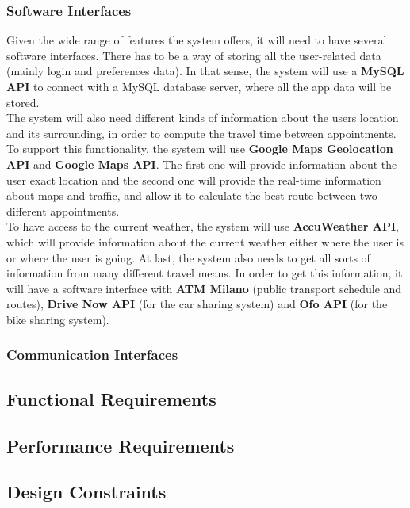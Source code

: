 \documentclass[12pt]{article}
\begin{document}
\subsubsection{Software Interfaces}
Given the wide range of features the system offers, it will need to have several software interfaces. There has to be a way of storing all the user-related data (mainly login and preferences data). In that sense, the system will use a \textbf{MySQL API} to connect with a MySQL database server, where all the app data will be stored.\\
The system will also need different kinds of information about the users location and its surrounding, in order to compute the travel time between appointments. To support this functionality, the system will use \textbf{Google Maps Geolocation API} and \textbf{Google Maps API}. The first one will provide information about the user exact location and the second one will provide the real-time information about maps and traffic, and allow it to calculate the best route between two different appointments.\\
To have access to the current weather, the system will use \textbf{AccuWeather API}, which will provide information about the current weather either where the user is or where the user is going.
At last, the system also needs to get all sorts of information from many different travel means. In order to get this information, it will have a software interface with \textbf{ATM Milano} (public transport schedule and routes), \textbf{Drive Now API} (for the car sharing system) and \textbf{Ofo API} (for the bike sharing system).



\subsubsection{Communication Interfaces}

\subsection{Functional Requirements}

\subsection{Performance Requirements}

\subsection{Design Constraints}
\end{document}
